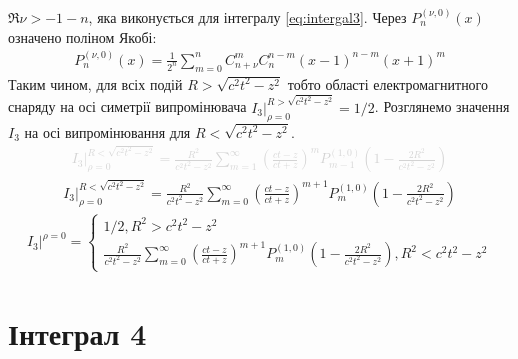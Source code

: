 $ \Re \nu > - 1 - n $, яка виконується для інтегралу \eqref{eq:intergal3}. 
Через $ P_n^{(\nu,0)} (x) $ означено поліном Якобі:
%
\begin{equation*} \begin{aligned}
P_n^{(\nu,0)} (x) = \frac{1}{2^n} \sum_{m=0}^{n} C_{n+\nu}^{m} C_{n}^{n-m} 
\left( x - 1 \right)^{n-m} \left( x + 1 \right)^m 
\end{aligned} \end{equation*}
%
Таким чином, для всіх подій $ R > \sqrt{c^2 t^2 - z^2} $ тобто області 
електромагнитного снаряду на осі симетрії випромінювача 
$ \left. I_3 \right|_{\rho = 0}^{R > \sqrt{c^2 t^2 - z^2}} = 1/2 $. Розглянемо 
значення $ I_3 $ на осі випромінювання для $ R < \sqrt{c^2 t^2 - z^2} $.
%
\textcolor{lightgray}{ \begin{equation*} \begin{aligned}
\left. I_3 \right|_{\rho = 0}^{R < \sqrt{c^2 t^2 - z^2}} = 
\frac{R^2}{c^2 t^2 - z^2} \sum_{m=1}^{\infty} 
\left( \frac{ct - z}{ct + z} \right)^m P_{m-1}^{(1,0)} 
\left( 1 - \frac{2R^2}{c^2 t^2 - z^2} \right)
\end{aligned} \end{equation*} }
%
\begin{equation*} \begin{aligned}
\left. I_3 \right|_{\rho = 0}^{R < \sqrt{c^2 t^2 - z^2}} = 
\frac{R^2}{c^2 t^2 - z^2} \sum_{m=0}^{\infty} 
\left( \frac{ct - z}{ct + z} \right)^{m+1} P_{m}^{(1,0)} 
\left( 1 - \frac{2R^2}{c^2 t^2 - z^2} \right)
\end{aligned} \end{equation*}
%
\begin{equation} \begin{aligned} \label{eq:i3onaxis}
\left. I_3 \right|^{\rho = 0} = \begin{cases} 1/2, R^2 > c^2 t^2 - z^2 \\
\frac{R^2}{c^2 t^2 - z^2} \sum_{m=0}^{\infty} 
\left( \frac{ct - z}{ct + z} \right)^{m+1} P_{m}^{(1,0)} 
\left( 1 - \frac{2R^2}{c^2 t^2 - z^2} \right), 
R^2 < c^2 t^2 - z^2 \end{cases}
\end{aligned} \end{equation}

\section{Інтеграл 4}

